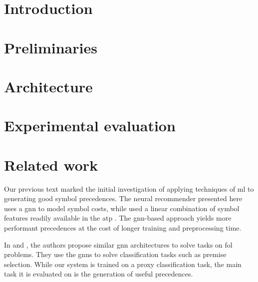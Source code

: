 \documentclass[runningheads]{llncs}
\begin{document}
\maketitle

\begin{abstract}

\end{abstract}

\section{Introduction}



\section{Preliminaries}
\label{sec:preliminaries}


\section{Architecture}
\label{sec:architecture}


\section{Experimental evaluation}
\label{sec:evaluation}


\section{Related work}
\label{sec:related}

Our previous text \cite{DBLP:conf/cade/Bartek020} marked the initial investigation of applying techniques of \acrlong{ml}
to generating good symbol precedences.
The neural recommender presented here uses a \gls{gnn} to model symbol costs,
while \cite{DBLP:conf/cade/Bartek020} used a linear combination of symbol features readily available in the \gls{atp} \Vampire{}.
The \gls{gnn}-based approach yields more performant precedences at the cost of longer training and preprocessing time.

In \cite{Olsak2019} and \cite{Rawson2020}, the authors propose similar \gls{gnn} architectures to solve tasks on \gls{fol} problems.
They use the \glspl{gnn} to solve classification tasks such as premise selection.
While our system is trained on a proxy classification task,
the main task it is evaluated on is the generation of useful precedences.
\end{document}
